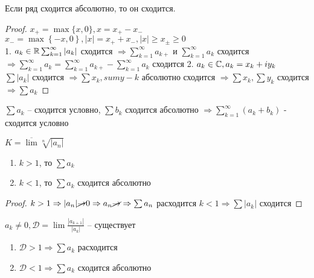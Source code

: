 \begin{Cons}
	Если ряд сходится абсолютно, то он сходится. 
\end{Cons}

\begin{proof}
	$x_+ = \max\{x,0\}, x = x_+-x_-$\\
	$x_- = \max \left\{ -x, 0\right\}, |x| = x_+ + x_-, |x| \geqslant x_{\pm} \geqslant 0$\\
	1. $a_k \in \mathbb{R}\\ 
	\sum_{k=1}^{\infty} |a_k|$ сходится $\Rightarrow \sum_{k=1}^{\infty} a_{k+}$ и 
	$\sum_{k=1}^{\infty} a_k$ сходится $\Rightarrow \sum_{k=1}^{\infty} a_k = \sum_{k=1}^{\infty} a_{k+} - 
	\sum_{k=1}^{\infty} a_k$ сходится 
	2. $a_k \in \mathbb{C}, a_k = x_k + i y_k$\\
	$\sum |a_k|$ сходится $\Rightarrow \sum x_k, sum y-k$ абсолютно сходится $\Rightarrow
	\sum x_k, \sum y_k$ сходится $\Rightarrow \sum a_k$ 
\end{proof}

\begin{Rem}
	$\sum a_k$ -- сходится условно, $\sum b_k$ сходится абсолютно $\Rightarrow
	\sum_{k=1}^{\infty} (a_k + b_k)$ - сходится условно
\end{Rem}

\begin{Thm} 
	$K = \overline{\lim} \sqrt[n]{|a_n|}$
	\begin{enumerate}
		\item $k > 1$, то $\sum a_k$
		\item $k<1$, то $\sum a_k$ сходится абсолютно 
	\end{enumerate}
\end{Thm} 

\begin{proof}
	$k>1 \Rightarrow |a_n| \cancel{\to} 0 \Rightarrow a_n \cancel{\to} \Rightarrow \sum a_n$ расходится
	$k < 1 \Rightarrow \sum |a_k|$ сходится
\end{proof}

\begin{Thm}
	$a_k \neq 0, \mathcal{D} = \lim \frac{|a_{k+1}|}{|a_k|}$ -- существует 
	\begin{enumerate}
		\item $\mathcal{D} > 1 \Rightarrow \sum a_k$ расходится
		\item $\mathcal{D} < 1 \Rightarrow \sum a_k$ сходится абсолютно
	\end{enumerate}
\end{Thm} 

